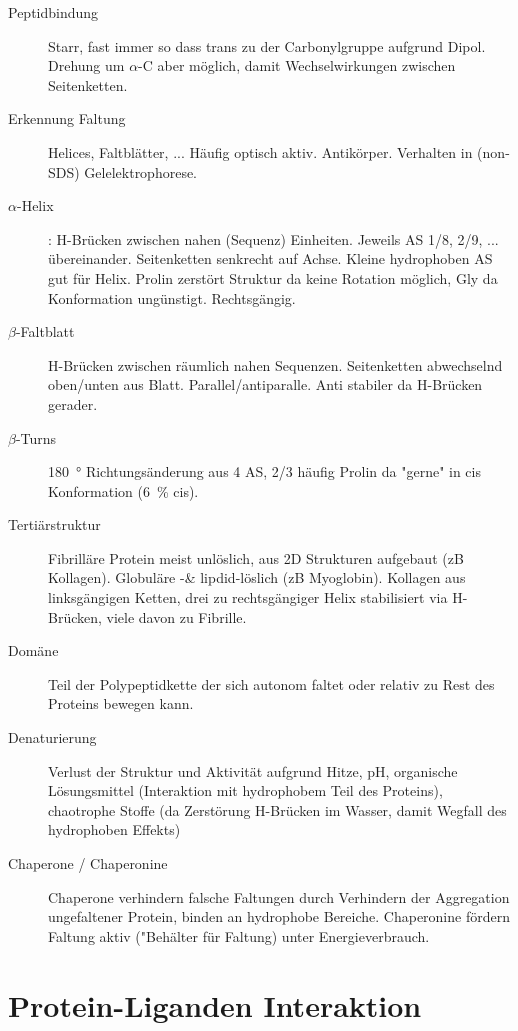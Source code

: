 \documentclass[a4paper,twocolumn,english,fontsize=7,DIV=16]{scrartcl}
\begin{document}
\begin{description}
	\item[Peptidbindung] Starr, fast immer so dass  trans zu 
		der Carbonylgruppe aufgrund Dipol. Drehung um $\alpha$-C aber
		möglich, damit Wechselwirkungen zwischen Seitenketten.
	\item[Erkennung Faltung] Helices, Faltblätter, ... Häufig optisch
		aktiv. Antikörper. Verhalten in (non-SDS) Gelelektrophorese.
	\item[$\alpha$-Helix]: H-Brücken zwischen nahen (Sequenz) Einheiten.
		Jeweils AS 1/8, 2/9, ... übereinander. Seitenketten senkrecht
		auf Achse. Kleine hydrophoben AS gut für Helix. Prolin zerstört
		Struktur da keine Rotation möglich, Gly da Konformation
		ungünstigt. Rechtsgängig.
	\item[$\beta$-Faltblatt] H-Brücken zwischen räumlich nahen Sequenzen.
		Seitenketten abwechselnd oben/unten aus Blatt.
		Parallel/antiparalle. Anti stabiler da H-Brücken gerader.
	\item[$\beta$-Turns] \SI{180}{\degree} Richtungsänderung aus 4 AS, 2/3
		häufig Prolin da "gerne" in cis Konformation (\SI{6}{\percent}
		cis).
	\item[Tertiärstruktur] Fibrilläre Protein meist unlöslich, aus 2D
		Strukturen aufgebaut (zB Kollagen). Globuläre -\&
		lipdid-löslich (zB Myoglobin). Kollagen aus linksgängigen
		Ketten, drei zu rechtsgängiger Helix stabilisiert via
		H-Brücken, viele davon zu Fibrille.
	\item[Domäne] Teil der Polypeptidkette der sich autonom faltet oder
		relativ zu Rest des Proteins bewegen kann.
	\item[Denaturierung] Verlust der Struktur und Aktivität aufgrund Hitze,
		pH, organische Lösungsmittel (Interaktion mit hydrophobem Teil
		des Proteins), chaotrophe Stoffe (da Zerstörung H-Brücken im
		Wasser, damit Wegfall des hydrophoben Effekts)
	\item[Chaperone / Chaperonine] Chaperone verhindern falsche Faltungen
		durch Verhindern der Aggregation ungefaltener Protein, binden
		an hydrophobe Bereiche. Chaperonine fördern Faltung aktiv
		("Behälter für Faltung) unter Energieverbrauch.
\end{description}

\section{Protein-Liganden Interaktion}
\end{document}
